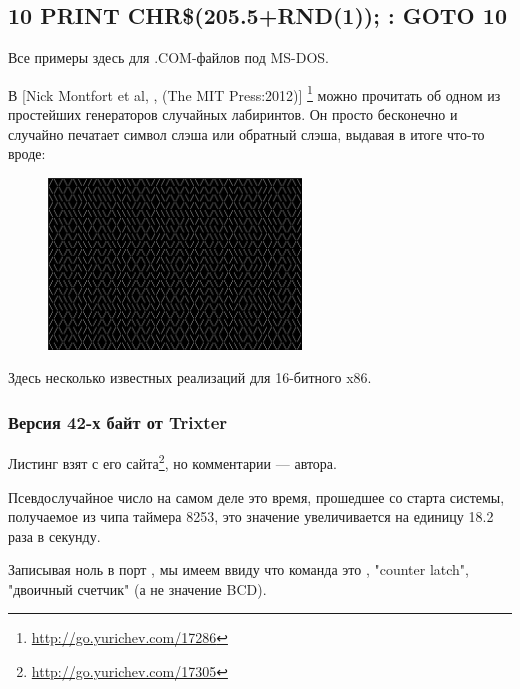 \subsection{10 PRINT CHR\$(205.5+RND(1)); : GOTO 10}

Все примеры здесь для .COM-файлов под MS-DOS.

В [Nick Montfort et al, , (The MIT Press:2012)]
\footnote{\AlsoAvailableAs \url{http://go.yurichev.com/17286}}
можно прочитать об одном из простейших генераторов случайных лабиринтов.
Он просто бесконечно и случайно печатает символ слэша или обратный слэша, выдавая в итоге что-то вроде:

\begin{figure}[H]
\centering
\includegraphics[width=0.6\textwidth]{examples/demos/10print/10print.png}
\end{figure}

Здесь несколько известных реализаций для 16-битного x86.

\subsubsection{Версия 42-х байт от Trixter}

\newcommand{\FNURLTRIXTER}{\footnote{\url{http://go.yurichev.com/17305}}}

Листинг взят с его сайта\FNURLTRIXTER, но комментарии --- автора.



Псевдослучайное число на самом деле это время, прошедшее со старта системы, получаемое из чипа таймера 8253, 
это значение
увеличивается на единицу 18.2 раза в секунду.

Записывая ноль в порт , 
мы имеем ввиду что команда это , 
"counter latch", 
"двоичный счетчик" (а не значение \ac{BCD}).

